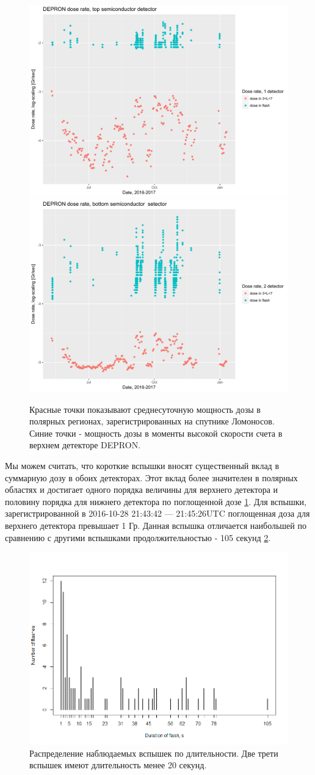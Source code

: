 \begin{figure}
	\centering
	\includegraphics[width=0.49\linewidth]{images/doseanalisys/flashdose1}
	\includegraphics[width=0.49\linewidth, trim={0 2cm 0 0}]{images/doseanalisys/flashdose2}
	\caption{Красные точки показывают среднесуточную мощность дозы в полярных регионах, зарегистрированных на спутнике Ломоносов. Синие точки - мощность дозы в моменты высокой скорости счета в верхнем детекторе DEPRON.}
	\label{fig:flashdose1}
\end{figure}
Мы можем считать, что короткие вспышки вносят существенный вклад в  суммарную дозу в обоих детекторах. Этот вклад более значителен в полярных областях и достигает одного порядка величины для верхнего детектора и половину порядка для нижнего детектора по поглощенной дозе \ref{fig:flashdose1}. Для вспышки, зарегистрированной в 2016-10-28 21:43:42 --- 21:45:26UTC поглощенная доза для верхнего детектора превышает 1 Гр. Данная вспышка отличается наибольшей по сравнению с другими вспышками продолжительностью - 105 секунд \ref{fig:rplot12}.

\begin{figure}
	\centering
	\includegraphics[width=0.7\linewidth]{images/Flash/Rplot12}
	\caption{Распределение наблюдаемых вспышек по длительности. Две трети вспышек имеют длительность менее 20 секунд.}
	\label{fig:rplot12}
\end{figure}




